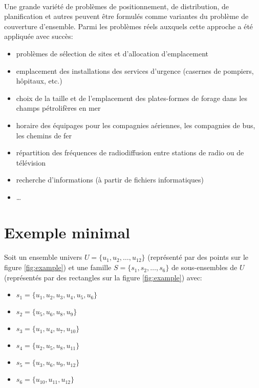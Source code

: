 \documentclass[12pt,letterpaper,twoside]{article}
\begin{document}
			\paragraph*{}
				Une grande variété de problèmes de positionnement, de distribution, de planification et autres peuvent être formulés comme variantes du problème de couverture d'ensemble. Parmi les problèmes réels auxquels cette approche a été appliquée avec succès:\cite{Balas1982}
				\begin{itemize}
					\item problèmes de sélection de sites et d'allocation d'emplacement
					\item emplacement des installations des services d'urgence (casernes de pompiers, hôpitaux, etc.)
					\item choix de la taille et de l'emplacement des plates-formes de forage dans les champs pétrolifères en mer
					\item horaire des équipages pour les compagnies aériennes, les compagnies de bus, les chemins de fer
					\item répartition des fréquences de radiodiffusion entre stations de radio ou de télévision
					\item recherche d'informations (à partir de fichiers informatiques)
					\item \ldots
				\end{itemize}
	\newpage\section{Exemple minimal}
		\paragraph*{}
			Soit un ensemble univers \(U = \{u_1, u_2, \dots, u_{12}\}\) (représenté par des points sur le figure \ref{fig:example}) et une famille \(S = \{s_1, s_2, \dots, s_6\}\) de sous-ensembles de \(U\) (représentés par des rectangles sur la figure \ref{fig:example}) avec:
			\begin{itemize}
				\item \(s_1 = \{u_1, u_2, u_3, u_4, u_5, u_6\}\)
				\item \(s_2 = \{u_5, u_6, u_8, u_9\}\)
				\item \(s_3 = \{u_1, u_4, u_7, u_{10}\}\)
				\item \(s_4 = \{u_2, u_5, u_8, u_{11}\}\)
				\item \(s_5 = \{u_3, u_6, u_9, u_{12}\}\)
				\item \(s_6 = \{u_{10}, u_{11}, u_{12}\}\)
			\end{itemize}
\end{document}
